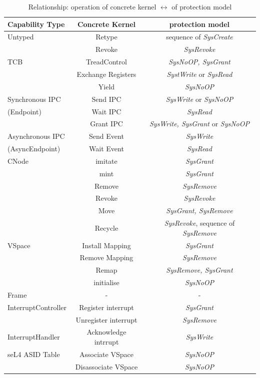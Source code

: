 \documentclass[pdftex,11pt,a4paper]{article}
\begin{document}
\begin{table}[H]
\begin{tabular}[h]{|l|c|c|}
\hline
Capability Type & Concrete Kernel & protection model \\
\hline
\hline
Untyped & Retype & sequence of \textit{SysCreate} \\
& Revoke & \textit{SysRevoke} \\
\hline
TCB & TreadControl & \textit{SysNoOP, SysGrant} \\
& Exchange Registers & \textit{SystWrite} or \textit{SysRead} \\
& Yield & \textit{SysNoOP} \\
\hline
Synchronous IPC & Send IPC & \textit{SysWrite} or \textit{SysNoOP} \\
(Endpoint) & Wait IPC & \textit{SysRead} \\
& Grant IPC & \textit{SysWrite, SysGrant} or \textit{SysNoOP} \\
\hline
Asynchronous IPC & Send Event & \textit{SysWrite} \\
(AsyncEndpoint) & Wait Event & \textit{SysRead} \\
\hline
CNode & imitate & \textit{SysGrant} \\
& mint & \textit{SysGrant} \\
& Remove & \textit{SysRemove} \\
& Revoke & \textit{SysRevoke} \\
& Move & \textit{SysGrant, SysRemove} \\
& Recycle & \textit{SysRevoke}, sequence of \textit{SysRemove} \\
\hline
VSpace & Install Mapping & \textit{SysGrant} \\
& Remove Mapping & \textit{SysRemove} \\
& Remap & \textit{SysRemove, SysGrant} \\
& initialise & \textit{SysNoOP} \\
\hline
Frame & - & - \\
\hline
InterruptController & Register interrupt & \textit{SysGrant} \\
& Unregister interrupt & \textit{SysRemove} \\
\hline
InterruptHandler & Acknowledge intrrupt & \textit{SysWrite} \\
\hline
seL4 ASID Table & Associate VSpace & \textit{SysNoOP} \\
& Disassociate VSpace & \textit{SysNoOP} \\
\hline
\end{tabular}
\caption{Relationship: operation of concrete kernel $\longleftrightarrow$ of protection model \cite{PhDseL4}}
\end{table}
\end{document}
